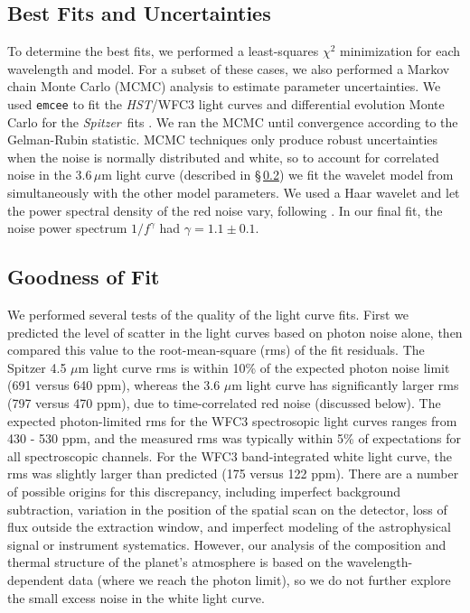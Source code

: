 \documentclass[twocolumn]{aastex61}
\newcommand{\project}[1]{\textsl{#1}}
\newcommand{\HST}{\project{HST}}
\newcommand{\Spitzer}{\project{Spitzer}}
\begin{document}

\subsection{Best Fits and Uncertainties}
To determine the best fits, we performed a least-squares $\chi^2$ minimization for each wavelength and model. For a subset of these cases, we also performed a Markov chain Monte Carlo (MCMC) analysis to estimate parameter uncertainties. We used \texttt{emcee} \citep{foremanmackey13} to fit the \HST/WFC3 light curves and differential evolution Monte Carlo for the \Spitzer\ fits \citep{braak06}. We ran the MCMC until convergence according to the Gelman-Rubin statistic. MCMC techniques only produce robust uncertainties when the noise is normally distributed and white, so to account for correlated noise in the $3.6\,\mu$m light curve (described in \S\,\ref{sec:fitquality}) we fit the wavelet model from \cite{carter09} simultaneously with the other model parameters. We used a Haar wavelet and let the power spectral density of the red noise vary, following \cite{diamond-lowe14}. In our final fit, the noise power spectrum $1/f^\gamma$ had $\gamma = 1.1 \pm 0.1$.  

\subsection{Goodness of Fit}
\label{sec:fitquality}
We performed several tests of the quality of the light curve fits.  First we predicted the level of scatter in the light curves based on photon noise alone, then compared this value to the root-mean-square (rms) of the fit residuals.  The Spitzer 4.5 $\mu$m light curve rms is within 10\% of the expected photon noise limit (691 versus 640 ppm), whereas the 3.6 $\mu$m light curve has significantly larger rms (797 versus 470 ppm), due to time-correlated red noise (discussed below). The expected photon-limited rms for the WFC3 spectrosopic light curves ranges from 430 - 530 ppm, and the measured rms was typically within 5\% of expectations for all spectroscopic channels.  For the WFC3 band-integrated white light curve, the rms was slightly larger than predicted (175 versus 122 ppm). There are a number of possible origins for this discrepancy, including imperfect background subtraction, variation in the position of the spatial scan on the detector, loss of flux outside the extraction window, and imperfect modeling of the astrophysical signal or instrument systematics. However, our analysis of the composition and thermal structure of the planet's atmosphere is based on the wavelength-dependent data (where we reach the photon limit), so we do not further explore the small excess noise in the white light curve. 
\end{document}
